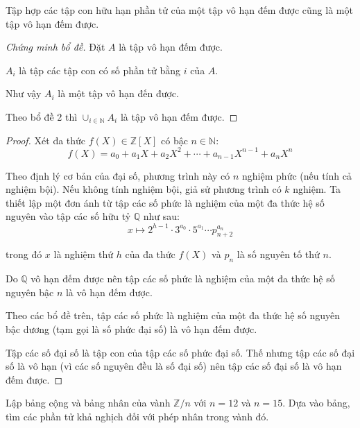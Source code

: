 \documentclass[class=linearalgebra,crop=false]{standalone}
\begin{document}
\begin{lemma}Tập hợp các tập con hữu hạn phần tử của một tập vô hạn đếm được cũng là một tập vô hạn đếm được.
\end{lemma}

\begin{proof}[Chứng minh bổ đề]Đặt $A$ là tập vô hạn đếm được.
    \par $A_{i}$ là tập các tập con có số phần tử bằng $i$ của $A$.
    \par Như vậy $A_{i}$ là một tập vô hạn đến được.
    \par Theo bổ đề 2 thì $\cup_{i\in\mathbb{N}}A_{i}$ là tập vô hạn đếm được.
\end{proof}

\begin{proof}Xét đa thức $f(X) \in \mathbb{Z}[X]$ có bậc $n \in \mathbb{N}$:
    \[ f(X) = a_{0} + a_{1}X + a_{2}X^{2} + \cdots + a_{n-1}X^{n-1} + a_{n}X^{n} \]
    \par Theo định lý cơ bản của đại số, phương trình này có $n$ nghiệm phức (nếu tính cả nghiệm bội). Nếu không tính nghiệm bội, giả sử phương trình có $k$ nghiệm. Ta thiết lập một đơn ánh từ tập các số phức là nghiệm của một đa thức hệ số nguyên vào tập các số hữu tỷ $\mathbb{Q}$ như sau:
    \[ x\longmapsto 2^{h - 1}\cdot 3^{a_{0}}\cdot 5^{a_{1}}\cdots p_{n+2}^{a_{n}} \]
    \par trong đó $x$ là nghiệm thứ $h$ của đa thức $f(X)$ và $p_{n}$ là số nguyên tố thứ $n$.
    \par Do $\mathbb{Q}$ vô hạn đếm được nên tập các số phức là nghiệm của một đa thức hệ số nguyên bậc $n$ là vô hạn đếm được.
    \par Theo các bổ đề trên, tập các số phức là nghiệm của một đa thức hệ số nguyên bậc dương (tạm gọi là số phức đại số) là vô hạn đếm được.
    \par Tập các số đại số là tập con của tập các số phức đại số. Thế nhưng tập các số đại số là vô hạn (vì các số nguyên đều là số đại số) nên tập các số đại số là vô hạn đếm được.
\end{proof}

\begin{exercise}Lập bảng cộng và bảng nhân của vành $\mathbb{Z}/n$ với $n = 12$ và $n = 15$. Dựa vào bảng, tìm các phần tử khả nghịch đối với phép nhân trong vành đó.
\end{exercise}
\end{document}

